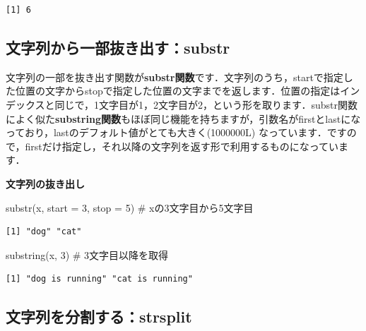 \documentclass[
  letterpaper,
  DIV=11,
  numbers=noendperiod]{scrreprt}
\newenvironment{Shaded}{\begin{snugshade}}{\end{snugshade}}
\newcommand{\AttributeTok}[1]{\textcolor[rgb]{0.40,0.45,0.13}{#1}}
\newcommand{\CommentTok}[1]{\textcolor[rgb]{0.37,0.37,0.37}{#1}}
\newcommand{\DecValTok}[1]{\textcolor[rgb]{0.68,0.00,0.00}{#1}}
\newcommand{\FunctionTok}[1]{\textcolor[rgb]{0.28,0.35,0.67}{#1}}
\newcommand{\NormalTok}[1]{\textcolor[rgb]{0.00,0.23,0.31}{#1}}
\begin{document}
\begin{verbatim}
[1] 6
\end{verbatim}

\hypertarget{ux6587ux5b57ux5217ux304bux3089ux4e00ux90e8ux629cux304dux51faux3059substr}{%
\subsection{文字列から一部抜き出す：substr}\label{ux6587ux5b57ux5217ux304bux3089ux4e00ux90e8ux629cux304dux51faux3059substr}}

文字列の一部を抜き出す関数が\textbf{substr関数}です．文字列のうち，startで指定した位置の文字からstopで指定した位置の文字までを返します．位置の指定はインデックスと同じで，1文字目が1，2文字目が2，という形を取ります．substr関数によく似た\textbf{substring関数}もほぼ同じ機能を持ちますが，引数名がfirstとlastになっており，lastのデフォルト値がとても大きく(1000000L)
なっています．ですので，firstだけ指定し，それ以降の文字列を返す形で利用するものになっています．

\textbf{文字列の抜き出し}

\begin{Shaded}
\begin{Highlighting}[]
\FunctionTok{substr}\NormalTok{(x, }\AttributeTok{start =} \DecValTok{3}\NormalTok{, }\AttributeTok{stop =} \DecValTok{5}\NormalTok{) }\CommentTok{\# xの3文字目から5文字目}
\end{Highlighting}
\end{Shaded}

\begin{verbatim}
[1] "dog" "cat"
\end{verbatim}

\begin{Shaded}
\begin{Highlighting}[]
\FunctionTok{substring}\NormalTok{(x, }\DecValTok{3}\NormalTok{) }\CommentTok{\# 3文字目以降を取得}
\end{Highlighting}
\end{Shaded}

\begin{verbatim}
[1] "dog is running" "cat is running"
\end{verbatim}

\hypertarget{ux6587ux5b57ux5217ux3092ux5206ux5272ux3059ux308bstrsplit}{%
\subsection{文字列を分割する：strsplit}\label{ux6587ux5b57ux5217ux3092ux5206ux5272ux3059ux308bstrsplit}}
\end{document}
